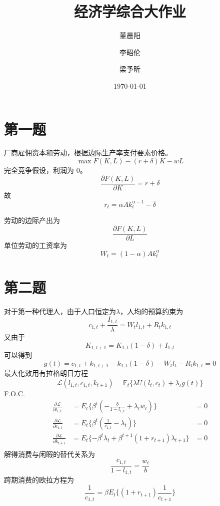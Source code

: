 \documentclass[a4paper,12pt]{ctexart}
\title{经济学综合大作业}
\author{董晨阳 \and 李昭伦 \and 梁予昕}
\date{\today}
\begin{document}
\maketitle
\section{第一题}\label{sec:1}
厂商雇佣资本和劳动，根据边际生产率支付要素价格。
$$\max F(K, L)-(r+\delta)K-wL$$
完全竞争假设，利润为 0。
$$\frac{\partial F(K,L)}{\partial K}=r+\delta$$
故
$$r_t=\alpha Ak_t^{\alpha-1}-\delta$$

劳动的边际产出为
$$\frac{\partial F(K,L)}{\partial L}$$
单位劳动的工资率为
$$W_t=(1-\alpha) Ak_t^\alpha$$
\section{第二题}
对于第一种代理人，由于人口恒定为$\lambda$，人均的预算约束为
\begin{equation*}
    c_{1,t}+\frac{I_{1,t}}{\lambda}=W_tl_{1,t}+R_tk_{1,t}
\end{equation*}
又由于
\begin{equation*}
    K_{1,t+1} = K_{1,t}(1 -\delta) + I_{1,t}
\end{equation*}
可以得到
\begin{equation*}
    g(t)=c_{1,t}+k_{1,t+1} - k_{1,t}(1 -\delta)-W_tl_t-R_tk_{1,t}=0
\end{equation*}
最大化效用有拉格朗日方程
\begin{equation*}
    \mathcal{L}(l_{1,t},c_{1,t},k_{t+1})=\mathbb{E}_t\{\lambda U(l_t,c_t)+\lambda_t g(t)\}
\end{equation*}
F.O.C.
\begin{eqnarray*}
    \frac{\partial \mathcal{L}}{\partial l_{1,t}}&=E_t\{\beta^t(-\frac{b}{1-l_{1,t}}+\lambda_tw_t)\}&=0\\
    \frac{\partial \mathcal{L}}{\partial c_{1,t}}&=E_t\{\beta^t(\frac{1}{c_{1,t}}-\lambda_t)\}&=0\\
    \frac{\partial \mathcal{L}}{\partial k_{t+1}}&=E_t\{-\beta^t\lambda_t+\beta^{t+1}(1+r_{t+1})\lambda_{t+1}\}&=0\\
\end{eqnarray*}
解得消费与闲暇的替代关系为
\begin{equation*}
    \frac{c_{1,t}}{1-l_{1,t}}=\frac{w_t}{b}
\end{equation*}
跨期消费的欧拉方程为
\begin{equation*}
    \frac{1}{c_{1,t}}=\beta E_t\{(1+r_{t+1})\frac{1}{c_{t+1}}\}
\end{equation*}
\end{document}
